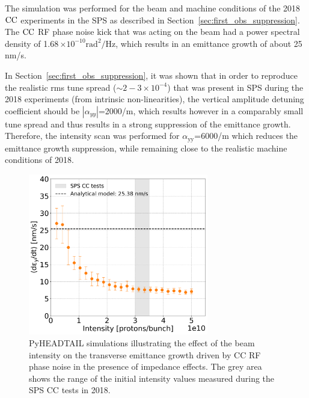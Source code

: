 The simulation was performed for the beam and machine conditions of the 2018 ${\mathrm{CC}}$ experiments in the SPS as described in Section~\ref{sec:first_obs_suppression}. The ${\mathrm{CC}}$ RF phase noise kick that was acting on the beam had a power spectral density of 1.68\,$\times 10^{-10}\mathrm{rad^2/Hz}$, which results in an emittance growth of about 25\,nm/s. 

In Section~\ref{sec:first_obs_suppression}, it was shown that in order to reproduce the realistic rms tune spread ($\sim 2-3 \times 10^{-4}$) that was present in SPS during the 2018 experiments (from intrinsic non-linearities), the vertical amplitude detuning coefficient should be $| \alpha_{yy} |$=2000/m, which results however in a comparably small tune spread and thus results in a strong suppression of the emittance growth. Therefore, the intensity scan was performed for $\alpha_\mathrm{yy}$=6000/m which reduces the emittance growth suppression, while remaining close to the realistic machine conditions of 2018.


\begin{figure}[!h] 
    \centering         
    \includegraphics[width=0.7\textwidth]{images/Ch7/sps_270GeV_PN1e-8_400MHz_QpxQpy5e-1_ayy6000_intensity_spsCCtests.png}
        \caption{PyHEADTAIL simulations illustrating the effect of the beam intensity on the transverse emittance growth driven by CC RF phase noise in the presence of impedance effects. The grey area shows the range of the initial intensity values measured during the SPS CC tests in 2018.}
        \label{fig:study_8_intensity_scan}
 \end{figure}


